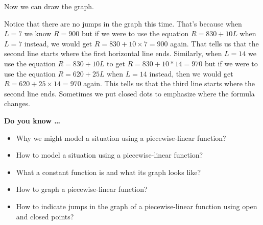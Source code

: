 Now we can draw the graph.

\begin{center}
\end{center}

Notice that there are no jumps in the graph this time. That's because when $L=7$ we know $R=900$ but if we were to use the equation $R=830+10L$ when $L=7$ instead, we would get $R = 830+10 \times 7 = 900$ again.  That tells us that the second line starts where the first horizontal line ends. Similarly, when $L=14$ we use the equation $R = 830+10L$ to get $R = 830+10*14=970$ but if we were to use the equation $R=620+25L$ when $L = 14$ instead, then we would get $R=620+25 \times 14 = 970$ again. This tells us that the third line starts where the second line ends.  Sometimes we put closed dots to emphasize where the formula changes. 

 

\noindent \textbf{Do you know \ldots}

\begin{itemize}
\item Why we might model a situation using a piecewise-linear function?
\item How to model a situation using a piecewise-linear function?
\item What a constant function is and what its graph looks like?
\item How to graph a piecewise-linear function?
\item How to indicate jumps in the graph of a piecewise-linear function using open and closed points?
  
\end{itemize}

